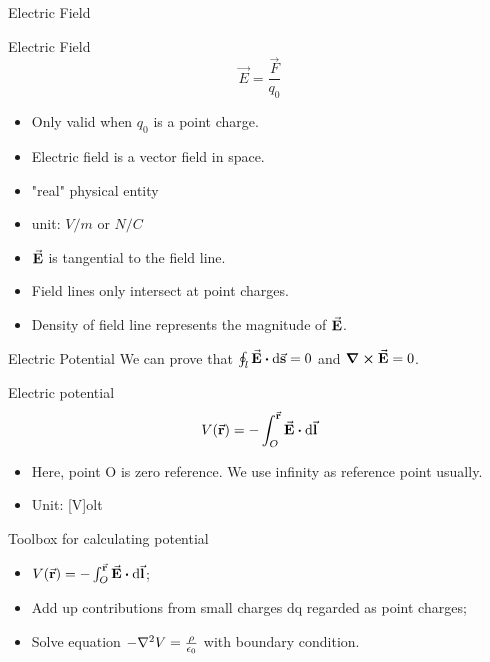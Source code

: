 \documentclass{beamer}
\begin{document}
\begin{frame}{Electric Field}	
	\begin{beamerboxesrounded}[shadow=true]{Electric Field}
        \begin{equation}
			\vec{E} = \frac{\vec{F}}{q_0}
		\end{equation}
    \end{beamerboxesrounded}
	
	\begin{itemize}
		\item Only valid when $q_0$ is a point charge.
		\item Electric field is a vector field in space.
		\item "real" physical entity
        \item unit: $V/m$ or $N/C$
        \item $\va{E}$ is tangential to the field line.
		\item Field lines only intersect at point charges.
		\item Density of field line represents the magnitude of $\va{E}$.
	\end{itemize}
\end{frame}


\begin{frame}{Electric Potential}
    We can prove that $\oint_l \va{E} \vdot \dd{\va{s}} = 0$ and $\curl{\va{E}} = 0$.

    \begin{block}{Electric potential}
        \begin{equation}
            V(\va{r}) = -\int_O^{\va{r}} \va{E} \vdot \dd{\va{l}}
        \end{equation}

        \begin{itemize}
            \item Here, point O is zero reference. We use infinity as reference point usually.
            \item Unit: [V]olt
        \end{itemize}	
    \end{block}

    \begin{block}{Toolbox for calculating potential}
        \begin{itemize}
            \item $V(\va{r}) = -\int_O^{\va{r}} \va{E} \vdot \dd{\va{l}}$;
            \item Add up contributions from small charges dq regarded as point charges;
            \item Solve equation $- \laplacian{V} = \frac{\rho}{\epsilon_0}$ with boundary condition.
        \end{itemize}
    \end{block}
\end{frame}
\end{document}
